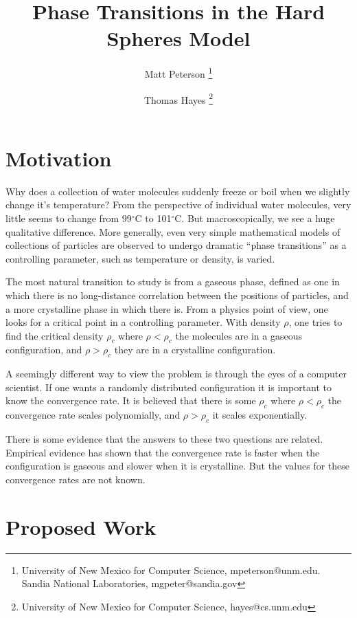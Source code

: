 \documentclass[a4paper,11pt]{article}
\title{Phase Transitions in the Hard Spheres Model}
\author{Matt Peterson \thanks{University of New Mexico for Computer Science, mpeterson@unm.edu. Sandia National Laboratories, mgpeter@sandia.gov} \and Thomas Hayes \thanks{University of New Mexico for Computer Science, hayes@cs.unm.edu}}
\begin{document}
\maketitle

\section*{Motivation}

Why does a collection of water molecules suddenly freeze or boil when we slightly change it's temperature?  From the perspective of individual water molecules, very little seems to change from 99$^\circ$C to 101$^\circ$C.  But macroscopically, we see a huge qualitative difference.  More generally, even very simple mathematical models of collections of particles are observed to undergo dramatic ``phase transitions'' as a controlling parameter, such as temperature or density, is varied.

The most natural transition to study is from a gaseous phase, defined as one in which there is no long-distance correlation between the positions of particles, and a more crystalline phase in which there is.  From a physics point of view, one looks for a critical point in a controlling parameter.  With density $\rho$, one tries to find the critical density $\rho_c$ where $\rho < \rho_c$ the molecules are in a gaseous configuration, and $\rho > \rho_c$ they are in a crystalline configuration.

A seemingly different way to view the problem is through the eyes of a computer scientist.  If one wants a randomly distributed configuration it is important to know the convergence rate.  It is believed that there is some $\rho_c$ where $\rho < \rho_c$ the convergence rate scales polynomially, and $\rho > \rho_c$ it scales exponentially.

There is some evidence that the answers to these two questions are related.  Empirical evidence has shown that the convergence rate is faster when the configuration is gaseous and slower when it is crystalline.  But the values for these convergence rates are not known.

\section*{Proposed Work}

\end{document}
